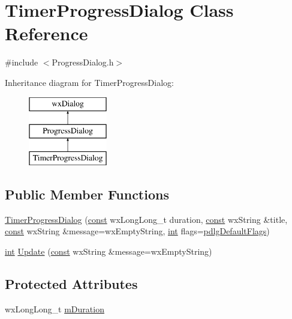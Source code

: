 \hypertarget{class_timer_progress_dialog}{}\section{Timer\+Progress\+Dialog Class Reference}
\label{class_timer_progress_dialog}


{\ttfamily \#include $<$Progress\+Dialog.\+h$>$}

Inheritance diagram for Timer\+Progress\+Dialog\+:\begin{figure}[H]
\begin{center}
\leavevmode
\includegraphics[height=3.000000cm]{class_timer_progress_dialog}
\end{center}
\end{figure}
\subsection*{Public Member Functions}
\begin{DoxyCompactItemize}
\item 
\hyperlink{class_timer_progress_dialog_a74c581ae8c47d59671c9f3dbf51fc9bb}{Timer\+Progress\+Dialog} (\hyperlink{getopt1_8c_a2c212835823e3c54a8ab6d95c652660e}{const} wx\+Long\+Long\+\_\+t duration, \hyperlink{getopt1_8c_a2c212835823e3c54a8ab6d95c652660e}{const} wx\+String \&title, \hyperlink{getopt1_8c_a2c212835823e3c54a8ab6d95c652660e}{const} wx\+String \&message=wx\+Empty\+String, \hyperlink{xmltok_8h_a5a0d4a5641ce434f1d23533f2b2e6653}{int} flags=\hyperlink{_progress_dialog_8h_adc85bd6cdc8c05a110bc1f61b2130ca2affbc18282bf6628471d5e37851e1bd41}{pdlg\+Default\+Flags})
\item 
\hyperlink{xmltok_8h_a5a0d4a5641ce434f1d23533f2b2e6653}{int} \hyperlink{class_timer_progress_dialog_a6dfce96938efc5c8124cd2a51dd69fa4}{Update} (\hyperlink{getopt1_8c_a2c212835823e3c54a8ab6d95c652660e}{const} wx\+String \&message=wx\+Empty\+String)
\end{DoxyCompactItemize}
\subsection*{Protected Attributes}
\begin{DoxyCompactItemize}
\item 
wx\+Long\+Long\+\_\+t \hyperlink{class_timer_progress_dialog_ae6135ea7dd2b1d5abbfffc6cf8d529ad}{m\+Duration}
\end{DoxyCompactItemize}


